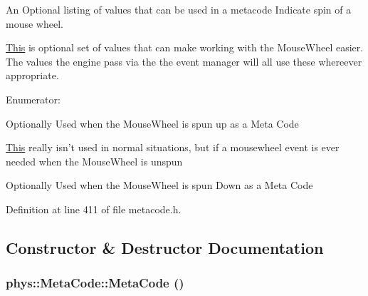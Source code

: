 An Optional listing of values that can be used in a metacode Indicate spin of a mouse wheel. 

\hyperlink{structThis}{This} is optional set of values that can make working with the MouseWheel easier. The values the engine pass via the the event manager will all use these whereever appropriate. \begin{Desc}
\item[Enumerator: ]\par
\begin{description}
\item[{\em 
\hypertarget{classphys_1_1MetaCode_af9ba277d1ef071be8861e35c2b7d82d6a15542262fc8fe9a3d6746f2b84ecde11}{
MOUSEWHEEL\_\-UP}
\label{da/dc9/classphys_1_1MetaCode_af9ba277d1ef071be8861e35c2b7d82d6a15542262fc8fe9a3d6746f2b84ecde11}
}]Optionally Used when the MouseWheel is spun up as a Meta Code \item[{\em 
\hypertarget{classphys_1_1MetaCode_af9ba277d1ef071be8861e35c2b7d82d6aa3d86fe74d1c191d7c57f886c0b8d99a}{
MOUSEWHEEL\_\-UNCHANGED}
\label{da/dc9/classphys_1_1MetaCode_af9ba277d1ef071be8861e35c2b7d82d6aa3d86fe74d1c191d7c57f886c0b8d99a}
}]\hyperlink{structThis}{This} really isn't used in normal situations, but if a mousewheel event is ever needed when the MouseWheel is unspun \item[{\em 
\hypertarget{classphys_1_1MetaCode_af9ba277d1ef071be8861e35c2b7d82d6ab6edd0886d2ec2d2917bbad96ce3d510}{
MOUSEWHEEL\_\-DOWN}
\label{da/dc9/classphys_1_1MetaCode_af9ba277d1ef071be8861e35c2b7d82d6ab6edd0886d2ec2d2917bbad96ce3d510}
}]Optionally Used when the MouseWheel is spun Down as a Meta Code \end{description}
\end{Desc}



Definition at line 411 of file metacode.h.



\subsection{Constructor \& Destructor Documentation}
\hypertarget{classphys_1_1MetaCode_ae2c80c84f924ddfd880f46ffe6a1746e}{
\subsubsection[{MetaCode}]{\setlength{\rightskip}{0pt plus 5cm}phys::MetaCode::MetaCode ()}}
\label{da/dc9/classphys_1_1MetaCode_ae2c80c84f924ddfd880f46ffe6a1746e}


